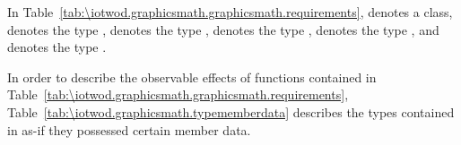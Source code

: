 \pnum
In Table~\ref{tab:\iotwod.graphicsmath.graphicsmath.requirements},  denotes a \tcode{\graphicsmathtemplparam} class,  denotes the type ,  denotes the type ,  denotes the type ,  denotes the type , and  denotes the type .%

\pnum
In order to describe the observable effects of functions contained in Table~\ref{tab:\iotwod.graphicsmath.graphicsmath.requirements}, Table~\ref{tab:\iotwod.graphicsmath.typememberdata} describes the types contained in  as-if they possessed certain member data. 

